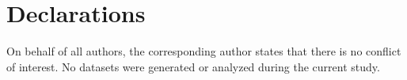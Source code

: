 \documentclass[11pt]{article}
\numberwithin{equation}{section}
\begin{document}
\section*{Declarations}
On behalf of all authors, the corresponding author states that there is no conflict of interest. No datasets were generated or analyzed during the current study.


\end{document}
